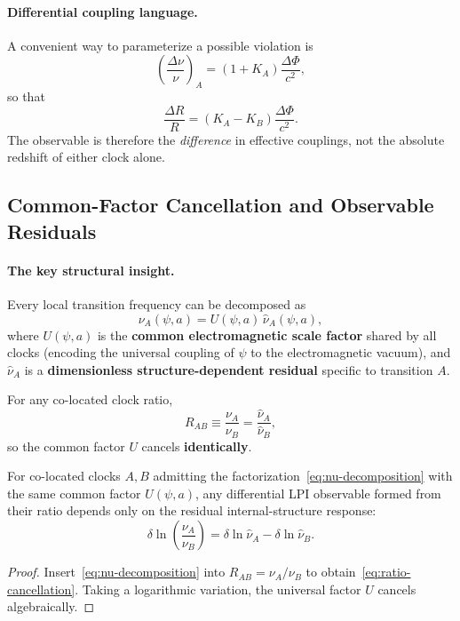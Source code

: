 \paragraph{Differential coupling language.}
A convenient way to parameterize a possible violation is
\begin{equation}\label{eq:lpi-KA}
\left(\frac{\Delta\nu}{\nu}\right)_A=(1+K_A)\frac{\Delta\Phi}{c^2},
\end{equation}
so that
\begin{equation}
\frac{\Delta R}{R}=(K_A-K_B)\frac{\Delta\Phi}{c^2}.
\end{equation}
The observable is therefore the \emph{difference} in effective couplings, not the absolute redshift of either clock alone.

\subsection{Common-Factor Cancellation and Observable Residuals}\label{sec:clocks-dfd}

\paragraph{The key structural insight.}
Every local transition frequency can be decomposed as
\begin{equation}\label{eq:nu-decomposition}
\nu_A(\psi,a) = U(\psi,a)\,\hat\nu_A(\psi,a),
\end{equation}
where $U(\psi,a)$ is the \textbf{common electromagnetic scale factor} shared by all clocks (encoding the universal coupling of $\psi$ to the electromagnetic vacuum), and $\hat\nu_A$ is a \textbf{dimensionless structure-dependent residual} specific to transition $A$.

For any co-located clock ratio,
\begin{equation}\label{eq:ratio-cancellation}
R_{AB} \equiv \frac{\nu_A}{\nu_B} = \frac{\hat\nu_A}{\hat\nu_B},
\end{equation}
so the common factor $U$ cancels \textbf{identically}.

\begin{theorem}\label{thm:clock-ratio}
For co-located clocks $A,B$ admitting the factorization~\eqref{eq:nu-decomposition} with the same common factor $U(\psi,a)$, any differential LPI observable formed from their ratio depends only on the residual internal-structure response:
\begin{equation}\label{eq:ratio-theorem}
\delta\ln\!\left(\frac{\nu_A}{\nu_B}\right) = \delta\ln\hat\nu_A - \delta\ln\hat\nu_B.
\end{equation}
\end{theorem}
\begin{proof}
Insert~\eqref{eq:nu-decomposition} into $R_{AB}=\nu_A/\nu_B$ to obtain~\eqref{eq:ratio-cancellation}.  Taking a logarithmic variation, the universal factor $U$ cancels algebraically.
\end{proof}

